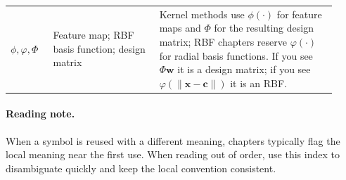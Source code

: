 \begin{table}[h]
{\begin{tabular}{@{}>{\raggedright\arraybackslash}p{0.12\linewidth} >{\raggedright\arraybackslash}p{0.30\linewidth} >{\raggedright\arraybackslash}p{0.50\linewidth}@{}}
\(\phi,\varphi,\Phi\) & Feature map; RBF basis function; design matrix & Kernel methods use \(\phi(\cdot)\) for feature maps and \(\Phi\) for the resulting design matrix; RBF chapters reserve \(\varphi(\cdot)\) for radial basis functions. If you see \(\Phi\mathbf{w}\) it is a design matrix; if you see \(\varphi(\|\mathbf{x}-\mathbf{c}\|)\) it is an RBF. \\
\end{tabular}
}
\end{table}

\paragraph{Reading note.} When a symbol is reused with a different meaning, chapters typically flag the local meaning near the first use. When reading out of order, use this index to disambiguate quickly and keep the local convention consistent.
